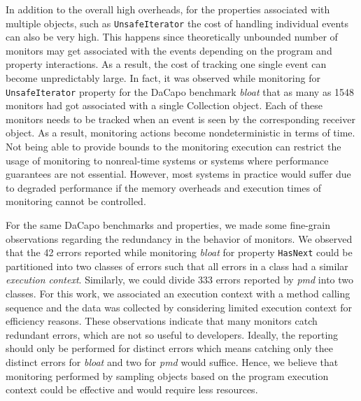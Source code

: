 In addition to the overall high overheads, for the properties associated with 
multiple objects, such as \texttt{UnsafeIterator} the cost of handling 
individual events can also be very high. This  happens since theoretically unbounded number of 
monitors may get associated with the events depending on the program and 
property interactions. As a result, the cost of tracking one single event can become 
unpredictably large. In fact, it was observed while monitoring for 
\texttt{UnsafeIterator} property for the \textsf{DaCapo} benchmark 
\textit{bloat} that as many as 1548 monitors had got associated with a single 
\textsf{Collection} object. Each of these monitors needs to be tracked when an 
event is seen by the corresponding receiver object. As a result, monitoring 
actions become nondeterministic in terms of time. Not being able to provide
bounds to the monitoring execution can 
restrict the usage of monitoring to nonreal-time systems or systems where 
performance guarantees are not essential. 
However, most systems in practice would suffer due to degraded performance if 
the memory overheads and execution times of monitoring cannot be controlled.


For the same DaCapo benchmarks and properties, we made some fine-grain 
observations regarding the redundancy in the behavior of monitors. We observed 
that the 42 errors reported while monitoring \textit{bloat}  for property 
\texttt{HasNext} could be partitioned into two classes of errors such that all 
errors in a class had a similar \textit{execution context}. Similarly, we could 
divide 333 errors reported by \textit{pmd} into two classes. For this work, we 
associated an execution context with a method calling sequence
and the data was collected  by considering limited execution context for efficiency 
reasons. These observations indicate that many monitors catch redundant errors, 
which are not so useful to developers. Ideally, the reporting should only be 
performed for distinct errors which means catching only thee distinct errors for 
\textit{bloat} and two for \textit{pmd} would suffice. Hence, we believe that 
monitoring performed by sampling objects based on the program execution context 
could be effective and would require less resources. 

